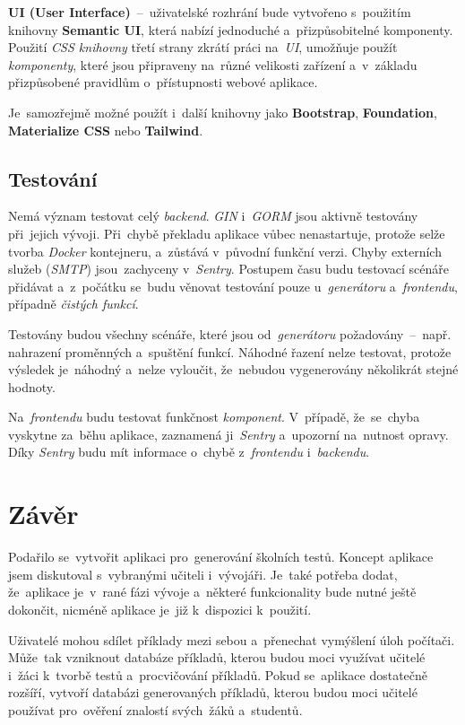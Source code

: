 \documentclass[11pt,a4paper]{report}
\begin{document}
            \textbf{UI (User Interface)}~--~uživatelské rozhrání bude vytvořeno s~použitím knihovny \textbf{Semantic UI}, která nabízí jednoduché a~přizpůsobitelné komponenty. Použití \emph{CSS knihovny} třetí strany zkrátí práci na~\emph{UI}, umožňuje použít \emph{komponenty}, které jsou připraveny na~různé velikosti zařízení a~v~základu přizpůsobené pravidlům o~přístupnosti webové aplikace.

            Je~samozřejmě možné použít i~další knihovny jako \textbf{Bootstrap}, \textbf{Foundation}, \textbf{Materialize CSS} nebo \textbf{Tailwind}.

        \section{Testování}
            Nemá význam testovat celý \emph{backend}. \emph{GIN} i~\emph{GORM} jsou aktivně testovány při~jejich vývoji. Při~chybě překladu aplikace vůbec nenastartuje, protože selže tvorba \emph{Docker} kontejneru, a~zůstává v~původní funkční verzi. Chyby externích služeb (\emph{SMTP}) jsou~zachyceny v~\emph{Sentry}. Postupem času budu testovací scénáře přidávat a~z~počátku se~budu věnovat testování pouze u~\emph{generátoru} a~\emph{frontendu}, případně \emph{čistých funkcí}.

            Testovány budou všechny scénáře, které jsou od~\emph{generátoru} požadovány~--~např. nahrazení proměnných a~spuštění funkcí. Náhodné řazení nelze testovat, protože výsledek je~náhodný a~nelze vyloučit, že~nebudou vygenerovány několikrát stejné hodnoty.

            Na~\emph{frontendu} budu testovat funkčnost \emph{komponent}. V~případě, že~se~chyba vyskytne za~běhu aplikace, zaznamená ji~\emph{Sentry} a~upozorní na~nutnost opravy. Díky \emph{Sentry} budu mít informace o~chybě z~\emph{frontendu} i~\emph{backendu}.
        
            
    \chapter{Závěr}
        Podařilo se~vytvořit aplikaci pro~generování školních testů. Koncept aplikace jsem diskutoval s~vybranými učiteli i~vývojáři. Je~také potřeba dodat, že~aplikace je~v~rané fázi vývoje a~některé funkcionality bude nutné ještě dokončit, nicméně aplikace je~již k~dispozici k~použití.
        
        Uživatelé mohou sdílet příklady mezi sebou a~přenechat vymýšlení úloh počítači. Může~tak vzniknout databáze příkladů, kterou budou moci využívat učitelé i~žáci k~tvorbě testů a~procvičování příkladů. Pokud se~aplikace dostatečně rozšíří, vytvoří databázi generovaných příkladů, kterou budou moci učitelé používat pro~ověření znalostí svých~žáků a~studentů.
        
\end{document}
